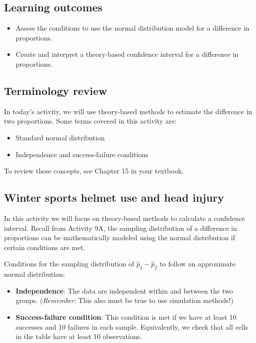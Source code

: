 \documentclass[
]{report}
\begin{document}

\hypertarget{learning-outcomes-18}{%
\subsection{Learning outcomes}\label{learning-outcomes-18}}

\begin{itemize}
\item
  Assess the conditions to use the normal distribution model for a difference in proportions.
\item
  Create and interpret a theory-based confidence interval for a difference in proportions.
\end{itemize}

\hypertarget{terminology-review-16}{%
\subsection{Terminology review}\label{terminology-review-16}}

In today's activity, we will use theory-based methods to estimate the difference in two proportions. Some terms covered in this activity are:

\begin{itemize}
\item
  Standard normal distribution
\item
  Independence and success-failure conditions
\end{itemize}

To review these concepts, see Chapter 15 in your textbook.

\hypertarget{winter-sports-helmet-use-and-head-injury}{%
\subsection{Winter sports helmet use and head injury}\label{winter-sports-helmet-use-and-head-injury}}

In this activity we will focus on theory-based methods to calculate a confidence interval. Recall from Activity 9A, the sampling distribution of a difference in proportions can be mathematically modeled using the normal distribution if certain conditions are met.

Conditions for the sampling distribution of \(\hat{p}_1-\hat{p}_2\) to follow an approximate normal distribution:

\begin{itemize}
\item
  \textbf{Independence}: The data are independent within and between the two groups. (\emph{Remember}: This also must be true to use simulation methods!)
\item
  \textbf{Success-failure condition}: This condition is met if we have at least 10 successes and 10 failures in each sample. Equivalently, we check that all cells in the table have at least 10 observations.
\end{itemize}
\end{document}
